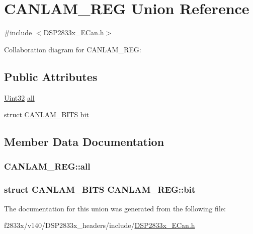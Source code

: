 \hypertarget{union_c_a_n_l_a_m___r_e_g}{}\section{C\+A\+N\+L\+A\+M\+\_\+\+R\+E\+G Union Reference}
\label{union_c_a_n_l_a_m___r_e_g}


{\ttfamily \#include $<$D\+S\+P2833x\+\_\+\+E\+Can.\+h$>$}



Collaboration diagram for C\+A\+N\+L\+A\+M\+\_\+\+R\+E\+G\+:
\subsection*{Public Attributes}
\begin{DoxyCompactItemize}
\item 
\hyperlink{_d_s_p2833x___device_8h_aba99025e657f892beb7ff31cecf64653}{Uint32} \hyperlink{union_c_a_n_l_a_m___r_e_g_aff04d73aa2cdfa676af79af2d3834309}{all}
\item 
struct \hyperlink{struct_c_a_n_l_a_m___b_i_t_s}{C\+A\+N\+L\+A\+M\+\_\+\+B\+I\+T\+S} \hyperlink{union_c_a_n_l_a_m___r_e_g_a8247314e3edc91438049fea11b7d2355}{bit}
\end{DoxyCompactItemize}


\subsection{Member Data Documentation}
\hypertarget{union_c_a_n_l_a_m___r_e_g_aff04d73aa2cdfa676af79af2d3834309}{}
\subsubsection[{all}]{ C\+A\+N\+L\+A\+M\+\_\+\+R\+E\+G\+::all}\label{union_c_a_n_l_a_m___r_e_g_aff04d73aa2cdfa676af79af2d3834309}
\hypertarget{union_c_a_n_l_a_m___r_e_g_a8247314e3edc91438049fea11b7d2355}{}
\subsubsection[{bit}]{\setlength{\rightskip}{0pt plus 5cm}struct {\bf C\+A\+N\+L\+A\+M\+\_\+\+B\+I\+T\+S} C\+A\+N\+L\+A\+M\+\_\+\+R\+E\+G\+::bit}\label{union_c_a_n_l_a_m___r_e_g_a8247314e3edc91438049fea11b7d2355}


The documentation for this union was generated from the following file\+:\begin{DoxyCompactItemize}
\item 
f2833x/v140/\+D\+S\+P2833x\+\_\+headers/include/\hyperlink{_d_s_p2833x___e_can_8h}{D\+S\+P2833x\+\_\+\+E\+Can.\+h}\end{DoxyCompactItemize}
